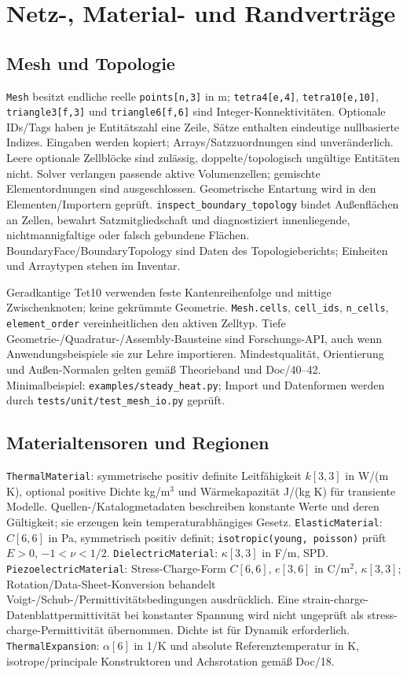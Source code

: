 \chapter{Netz-, Material- und Randverträge}
\label{api:mesh}
\begingroup\raggedright
\section{Mesh und Topologie}
\texttt{Mesh} besitzt endliche reelle \texttt{points[n,3]} in m;
\texttt{tetra4[e,4]}, \texttt{tetra10[e,10]}, \texttt{triangle3[f,3]} und
\texttt{triangle6[f,6]} sind Integer-Konnektivitäten. Optionale IDs/Tags haben
je Entitätszahl eine Zeile, Sätze enthalten eindeutige nullbasierte Indizes.
Eingaben werden kopiert; Arrays/Satzzuordnungen sind unveränderlich. Leere
optionale Zellblöcke sind zulässig, doppelte/topologisch ungültige Entitäten nicht.
Solver verlangen passende aktive Volumenzellen; gemischte Elementordnungen
sind ausgeschlossen. Geometrische Entartung wird in den Elementen/Importern
geprüft. \texttt{inspect\_boundary\_topology} bindet Außenflächen an Zellen,
bewahrt Satzmitgliedschaft und diagnostiziert innenliegende, nichtmannigfaltige
oder falsch gebundene Flächen. BoundaryFace/BoundaryTopology sind Daten des
Topologieberichts; Einheiten und Arraytypen stehen im Inventar.

Geradkantige Tet10 verwenden feste Kantenreihenfolge und mittige Zwischenknoten;
keine gekrümmte Geometrie. \texttt{Mesh.cells}, \texttt{cell\_ids},
\texttt{n\_cells}, \texttt{element\_order} vereinheitlichen den aktiven Zelltyp.
Tiefe Geometrie-/Quadratur-/Assembly-Bausteine sind Forschungs-API, auch wenn
Anwendungsbeispiele sie zur Lehre importieren. Mindestqualität, Orientierung
und Außen-Normalen gelten gemäß Theorieband und Doc/40--42.
Minimalbeispiel: \nolinkurl{examples/steady_heat.py}; Import und Datenformen
werden durch \nolinkurl{tests/unit/test_mesh_io.py} geprüft.

\section{Materialtensoren und Regionen}
\texttt{ThermalMaterial}: symmetrische positiv definite Leitfähigkeit $k[3,3]$
in W/(m K), optional positive Dichte kg/m$^3$ und Wärmekapazität J/(kg K) für
transiente Modelle. Quellen-/Katalogmetadaten beschreiben konstante Werte und
deren Gültigkeit; sie erzeugen kein temperaturabhängiges Gesetz.
\texttt{ElasticMaterial}: $C[6,6]$ in Pa, symmetrisch positiv definit;
\texttt{isotropic(young, poisson)} prüft $E>0$, $-1<\nu<1/2$.
\texttt{DielectricMaterial}: $\kappa[3,3]$ in F/m, SPD.
\texttt{PiezoelectricMaterial}: Stress-Charge-Form $C[6,6]$, $e[3,6]$
in C/m$^2$, $\kappa[3,3]$; Rotation/Data-Sheet-Konversion behandelt
Voigt-/Schub-/Permittivitätsbedingungen ausdrücklich. Eine strain-charge-
Datenblattpermittivität bei konstanter Spannung wird nicht ungeprüft als
stress-charge-Permittivität übernommen. Dichte ist für Dynamik erforderlich.
\texttt{ThermalExpansion}: $\alpha[6]$ in 1/K und absolute Referenztemperatur
in K, isotrope/principale Konstruktoren und Achsrotation gemäß Doc/18.

